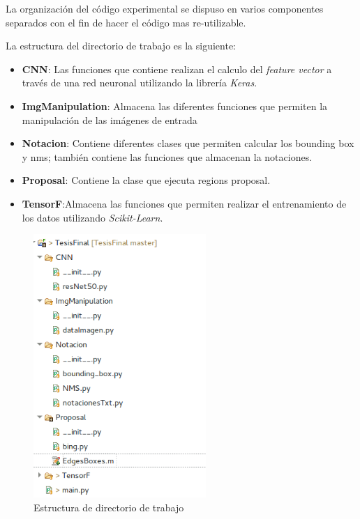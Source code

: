 La organización del código experimental se dispuso en varios componentes separados con el fin de hacer el código mas re-utilizable.

La estructura del directorio de trabajo es la siguiente:
\begin{itemize}
 \item \textbf{CNN}: Las funciones que contiene realizan el calculo del \textit{feature vector} a través de una red neuronal utilizando la librería 
\textit{Keras}.
 \item \textbf{ImgManipulation}: Almacena las diferentes funciones que permiten la manipulación de las imágenes de entrada 
 \item \textbf{Notacion}: Contiene diferentes clases que permiten calcular los bounding box y \ac{nms}; también contiene las funciones que almacenan 
la notaciones.
 \item \textbf{Proposal}: Contiene la clase que ejecuta regions proposal.
 \item \textbf{TensorF}:Almacena las funciones que permiten realizar el entrenamiento de los datos utilizando \textit{Scikit-Learn}.
\end{itemize}

\begin{figure}[H]
 \centering
  \includegraphics[height=10cm,keepaspectratio=true,clip=true]{imagenes/Logos/structureData.png}
  \caption{Estructura de directorio de trabajo}
\end{figure}


